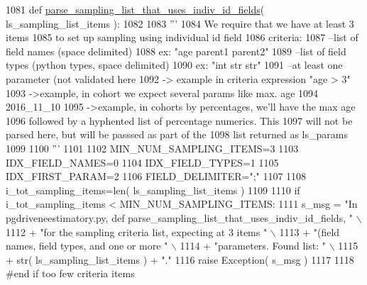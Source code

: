 \begin{DoxyCode}
1081 \textcolor{keyword}{def }\hyperlink{namespacenegui_1_1pgdriveneestimator_a367b16a89c7ae46ab0bda5b37e68d9af}{parse\_sampling\_list\_that\_uses\_indiv\_id\_fields}( 
      ls\_sampling\_list\_items ):
1082 
1083     \textcolor{stringliteral}{'''}
1084 \textcolor{stringliteral}{    We require that we have at least 3 items}
1085 \textcolor{stringliteral}{    to set up  sampling using individual id field}
1086 \textcolor{stringliteral}{    criteria:}
1087 \textcolor{stringliteral}{    --list of field names (space delimited)}
1088 \textcolor{stringliteral}{        ex: "age parent1 parent2"}
1089 \textcolor{stringliteral}{    --list of field types (python types, space delimited)}
1090 \textcolor{stringliteral}{        ex: "int str str"}
1091 \textcolor{stringliteral}{    --at least one parameter (not validated here}
1092 \textcolor{stringliteral}{        -> example in criteria expression  "age > 3"}
1093 \textcolor{stringliteral}{        ->example, in cohort we expect several params like max. age     }
1094 \textcolor{stringliteral}{    2016\_11\_10}
1095 \textcolor{stringliteral}{        ->example, in cohorts by percentages, we'll have the max age}
1096 \textcolor{stringliteral}{          followed by a hyphented list of percentage numerics.  This}
1097 \textcolor{stringliteral}{          will not be parsed here, but will be passsed as part of the}
1098 \textcolor{stringliteral}{          list returned as  ls\_params}
1099 \textcolor{stringliteral}{}
1100 \textcolor{stringliteral}{    '''}
1101 
1102     MIN\_NUM\_SAMPLING\_ITEMS=3
1103     IDX\_FIELD\_NAMES=0
1104     IDX\_FIELD\_TYPES=1
1105     IDX\_FIRST\_PARAM=2
1106     FIELD\_DELIMITER=\textcolor{stringliteral}{";"}
1107 
1108     i\_tot\_sampling\_items=len( ls\_sampling\_list\_items )
1109 
1110     \textcolor{keywordflow}{if} i\_tot\_sampling\_items < MIN\_NUM\_SAMPLING\_ITEMS:
1111         s\_msg = \textcolor{stringliteral}{"In pgdriveneestimatory.py, def parse\_sampling\_list\_that\_uses\_indiv\_id\_fields, "} \(\backslash\)
1112                     + \textcolor{stringliteral}{"for the sampling criteria list, expecting at 3 items "} \(\backslash\)
1113                     + \textcolor{stringliteral}{"(field names, field types, and one or more "} \(\backslash\)
1114                     + \textcolor{stringliteral}{"parameters.  Found list: "} \(\backslash\)
1115                     + str( ls\_sampling\_list\_items ) + \textcolor{stringliteral}{"."}
1116         \textcolor{keywordflow}{raise} Exception( s\_msg )
1117 
1118     \textcolor{comment}{#end if too few criteria items}

\end{DoxyCode}
